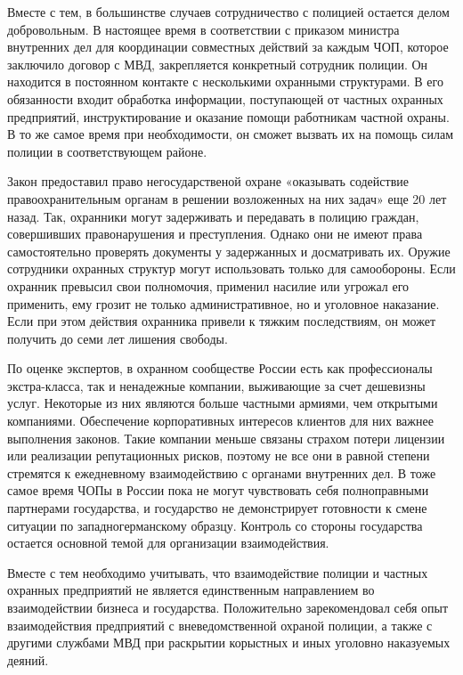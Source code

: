 \documentclass[a4paper,12pt,fleqn]{article} %
\begin{document}
Вместе с тем, в большинстве случаев сотрудничество с полицией остается делом добровольным. В настоящее время в соответствии с приказом министра внутренних дел для координации совместных действий за каждым ЧОП, которое заключило договор с МВД, закрепляется конкретный сотрудник полиции. Он находится в постоянном контакте с несколькими охранными структурами. В его обязанности входит обработка информации, поступающей от частных охранных предприятий, инструктирование и оказание помощи работникам частной охраны. В то же самое время при необходимости, он сможет вызвать их на помощь силам полиции в соответствующем районе.

Закон предоставил право негосударственой охране «оказывать содействие правоохранительным органам в решении возложенных на них задач» еще 20 лет назад. Так, охранники могут задерживать и передавать в полицию граждан, совершивших правонарушения и преступления. Однако они не имеют права самостоятельно проверять документы у задержанных и досматривать их. Оружие сотрудники охранных структур могут использовать только для самообороны. Если охранник превысил свои полномочия, применил насилие или угрожал его применить, ему грозит не только административное, но и уголовное наказание. Если при этом действия охранника привели к тяжким последствиям, он может получить до семи лет лишения свободы. 

По оценке экспертов, в охранном сообществе России есть как профессионалы экстра-класса, так и ненадежные компании, выживающие за счет дешевизны услуг. Некоторые из них являются больше частными армиями, чем открытыми компаниями. Обеспечение корпоративных интересов клиентов для них важнее выполнения законов. Такие компании меньше связаны страхом потери лицензии или реализации репутационных рисков, поэтому не все они в равной степени стремятся к ежедневному взаимодействию с органами внутренних дел. В тоже самое время ЧОПы в России пока не могут чувствовать себя полноправными партнерами государства, и государство не демонстрирует готовности к смене ситуации по западногерманскому образцу. Контроль со стороны государства остается основной темой для организации взаимодействия.  

Вместе с тем необходимо учитывать, что взаимодействие полиции и частных охранных предприятий не является единственным направлением во взаимодействии бизнеса и государства. Положительно зарекомендовал себя опыт взаимодействия предприятий с вневедомственной охраной полиции, а также с другими службами МВД при раскрытии корыстных и иных уголовно наказуемых деяний.\\
\end{document}
